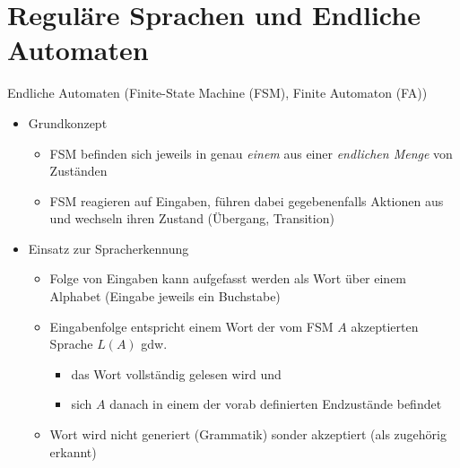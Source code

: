 \section{Reguläre Sprachen und Endliche Automaten}


\begin{frame}{Endliche Automaten (Finite-State Machine (FSM), Finite Automaton (FA))}
	\begin{itemize}
		\item Grundkonzept
		\begin{itemize}
			\item FSM befinden sich jeweils in genau \emph{einem} aus einer \emph{endlichen Menge} von Zuständen
			\item FSM reagieren auf Eingaben, führen dabei gegebenenfalls Aktionen aus und wechseln ihren Zustand (Übergang, Transition)
		\end{itemize}
		\item Einsatz zur Spracherkennung
		\begin{itemize}
			\item Folge von Eingaben kann aufgefasst werden als Wort über einem Alphabet (Eingabe jeweils ein Buchstabe)
			\item Eingabenfolge entspricht einem Wort der vom FSM $A$ akzeptierten Sprache $L(A)$ gdw.
			\begin{itemize}
				\item das Wort vollständig gelesen wird und
				\item sich $A$ danach in einem der vorab definierten Endzustände befindet
			\end{itemize}
			\item Wort wird nicht generiert (Grammatik) sonder akzeptiert (als zugehörig erkannt)
		\end{itemize}
	\end{itemize}
\end{frame}

